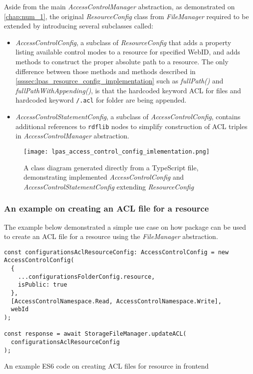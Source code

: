 Aside from the main \textit{AccessControlManager} abstraction, as demonstrated on \autoref{chap:num_1}, the original \textit{ResourceConfig} class from \textit{FileManager} required to be extended by introducing several subclasses called:
\begin{itemize}
    \item \textit{AccessControlConfig}, a subclass of \textit{ResourceConfig} that adds a property listing available control modes to a resource for specified WebID, and adds methods to construct the proper absolute path to a resource. The only difference between those methods and methods described in \autoref{ssssec:lpas_resource_config_implementation} such as \textit{fullPath()} and \textit{fullPathWithAppending()}, is that the hardcoded keyword ACL for files and hardcoded keyword \texttt{/.acl} for folder are being appended.
    \item \textit{AccessControlStatementConfig}, a subclass of \textit{AccessControlConfig}, contains additional references to \texttt{rdflib} nodes to simplify construction of ACL triples in \textit{AccessControlManager} abstraction.
\end{itemize}

\begin{figure}[h]
\centering
\texttt{[image: lpas\_access\_control\_config\_imlementation.png]}
\caption{A class diagram generated directly from a TypeScript file, demonstrating implemented \textit{AccessControlConfig} and \textit{AccessControlStatementConfig} extending \textit{ResourceConfig}}
\label{fig:lpas_access_control_config_imlementation}
\end{figure}

\subsubsection{An example on creating an ACL file for a \solid{} resource}

The example below demonstrated a simple use case on how \lpas{} package can be used to create an ACL file for a \solid{} resource using the \textit{FileManager} abstraction. 

\begin{listing}[H]    
\begin{verbatim}
const configurationsAclResourceConfig: AccessControlConfig = new AccessControlConfig(
  {
    ...configurationsFolderConfig.resource,
    isPublic: true
  },
  [AccessControlNamespace.Read, AccessControlNamespace.Write],
  webId
);

const response = await StorageFileManager.updateACL(
  configurationsAclResourceConfig
);
\end{verbatim}
\caption{An example ES6 code on creating ACL files for \solid{} resource in \lpa{} frontend} 
\label{lst:acl_creation_lpa_example}
\end{listing}

